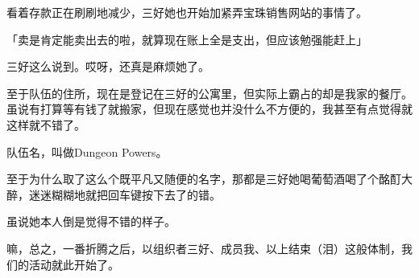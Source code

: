 看着存款正在刷刷地减少，三好她也开始加紧弄宝珠销售网站的事情了。

「卖是肯定能卖出去的啦，就算现在账上全是支出，但应该勉强能赶上」

三好这么说到。哎呀，还真是麻烦她了。

至于队伍的住所，现在是登记在三好的公寓里，但实际上霸占的却是我家的餐厅。虽说有打算等有钱了就搬家，但现在感觉也并没什么不方便的，我甚至有点觉得就这样就不错了。

队伍名，叫做Dungeon Powers。

至于为什么取了这么个既平凡又随便的名字，那都是三好她喝葡萄酒喝了个酩酊大醉，迷迷糊糊地就把回车键按下去了的错。

虽说她本人倒是觉得不错的样子。

嘛，总之，一番折腾之后，以组织者三好、成员我、以上结束（泪）这般体制，我们的活动就此开始了。
